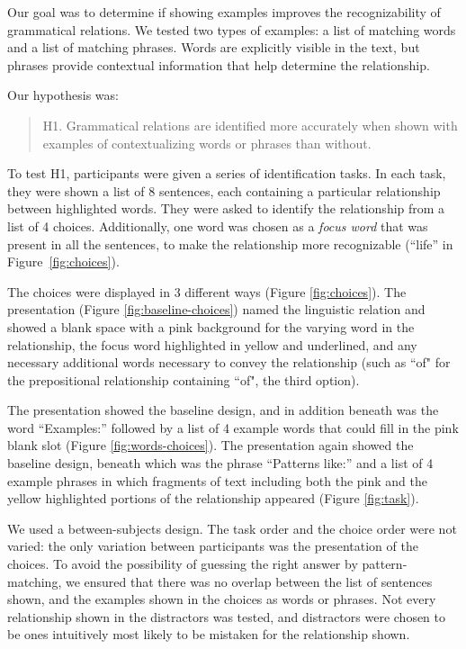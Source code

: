 

Our goal was to determine if showing examples improves the recognizability of grammatical relations. We tested two types of examples: a list of matching words and a list of matching phrases. Words are explicitly visible in the text, but phrases provide contextual information that help determine the relationship.

Our hypothesis was:
\begin{quote}
	H1. Grammatical relations are identified more accurately when shown with examples of contextualizing words or phrases than without.
\end{quote}

To test H1, participants were given a series of identification tasks. In each task, they were shown a list of 8 sentences, each containing a particular relationship between highlighted words. They were asked to identify the relationship from a list of 4 choices.  Additionally, one word was chosen as a \emph{focus word} that was present in all the sentences, to make the relationship more recognizable (``life'' in Figure~\ref{fig:choices}).

The choices were displayed in 3 different ways (Figure \ref{fig:choices}).  The  presentation
(Figure \ref{fig:baseline-choices}) named the linguistic relation and showed a blank space with a pink background for the varying word in the relationship, the focus word highlighted in yellow and underlined, and any necessary additional words necessary to convey the relationship (such as ``of" for the prepositional relationship containing ``of",  the third option).

The  presentation showed the baseline design, and in addition beneath was the word ``Examples:'' followed by a list of 4 example words that could fill in the pink blank slot (Figure \ref{fig:words-choices}).   The  presentation again showed the baseline design, beneath which was the phrase ``Patterns like:'' and a list of 4 example phrases in which fragments of text including both the pink and the yellow highlighted portions of the  relationship appeared (Figure \ref{fig:task}).

We used a between-subjects design. The task order and the choice order were not varied: the only variation between participants was the presentation of the choices. To avoid the possibility of  guessing the right answer by pattern-matching, we ensured that there was no overlap between the list of sentences shown, and the examples shown in the choices as words or phrases. Not every relationship shown in the distractors was tested, and distractors were chosen to be ones intuitively most likely to be mistaken for  the relationship shown.

